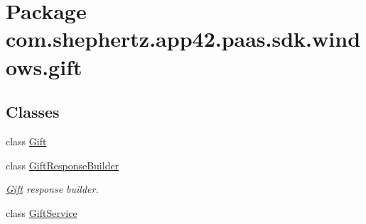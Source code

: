 \hypertarget{namespacecom_1_1shephertz_1_1app42_1_1paas_1_1sdk_1_1windows_1_1gift}{\section{Package com.\+shephertz.\+app42.\+paas.\+sdk.\+windows.\+gift}
\label{namespacecom_1_1shephertz_1_1app42_1_1paas_1_1sdk_1_1windows_1_1gift}
}
\subsection*{Classes}
\begin{DoxyCompactItemize}
\item 
class \hyperlink{classcom_1_1shephertz_1_1app42_1_1paas_1_1sdk_1_1windows_1_1gift_1_1_gift}{Gift}
\item 
class \hyperlink{classcom_1_1shephertz_1_1app42_1_1paas_1_1sdk_1_1windows_1_1gift_1_1_gift_response_builder}{Gift\+Response\+Builder}
\begin{DoxyCompactList}\small\item\em \hyperlink{classcom_1_1shephertz_1_1app42_1_1paas_1_1sdk_1_1windows_1_1gift_1_1_gift}{Gift} response builder. \end{DoxyCompactList}\item 
class \hyperlink{classcom_1_1shephertz_1_1app42_1_1paas_1_1sdk_1_1windows_1_1gift_1_1_gift_service}{Gift\+Service}
\end{DoxyCompactItemize}
